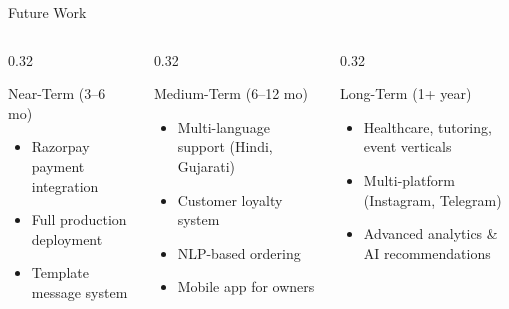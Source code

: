 \documentclass[aspectratio=169]{beamer}
\begin{document}
\begin{frame}{Future Work}

\begin{columns}[T]
\begin{column}{0.32\textwidth}
\begin{block}{\small Near-Term (3--6 mo)}
\begin{itemize}\small
  \item Razorpay payment integration
  \item Full production deployment
  \item Template message system
\end{itemize}
\end{block}
\end{column}
\begin{column}{0.32\textwidth}
\begin{block}{\small Medium-Term (6--12 mo)}
\begin{itemize}\small
  \item Multi-language support (Hindi, Gujarati)
  \item Customer loyalty system
  \item NLP-based ordering
  \item Mobile app for owners
\end{itemize}
\end{block}
\end{column}
\begin{column}{0.32\textwidth}
\begin{block}{\small Long-Term (1+ year)}
\begin{itemize}\small
  \item Healthcare, tutoring, event verticals
  \item Multi-platform (Instagram, Telegram)
  \item Advanced analytics \& AI recommendations
\end{itemize}
\end{block}
\end{column}
\end{columns}

\end{frame}
\end{document}
